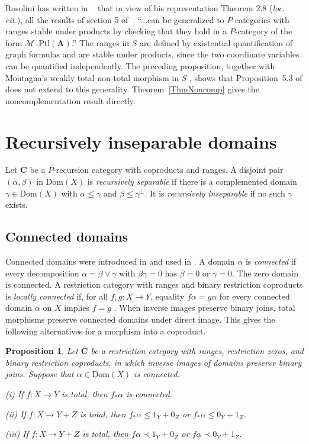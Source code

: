 \documentclass[letterpaper,10pt]{amsart}
\theoremstyle{plain}
\newtheorem{prop}[thm]{Proposition}
\theoremstyle{definition}
\newcommand{\MAP}[3]{{#1}:{#2}\rightarrow{#3}}
\begin{document}
Rosolini has written in  ~\cite[page 313]{MR90e:18001} that in view of his representation Theorem 2.8 ({\it loc. cit.}), all the results of section 5 of ~\cite{MR88i:03078} ``...can be generalized to $P$-categories with ranges stable under products by checking that they hold in a $P$-category of the form
$\mathcal{M}$--$\mathrm{Ptl}(\mathbf{A})$.'' The ranges in $S$ are defined
by existential quantification of graph formulas \cite[p.~111]{MR90i:03046}
and are stable under products, since the two coordinate variables can
be quantified independently. The preceding proposition,
together with Montagna's weakly total non-total morphism in $S$
\cite[Example~1, p.~112]{MR90i:03046}, shows that Proposition~5.3 of
\cite{MR88i:03078} does not extend to this generality. Theorem~\ref{ThmNoncomp} gives the noncomplementation result directly.

\section{Recursively inseparable domains}\label{sec:inseparability}

Let $\mathbf C$ be a $P$-recursion category with coproducts and ranges.
A disjoint pair $(\alpha,\beta)$ in $\mathrm{Dom}(X)$ is
\textit{recursively separable} if there is a complemented domain
$\gamma\in\mathrm{Dom}(X)$ with $\alpha\le\gamma$ and
$\beta\le\gamma^\perp$. It is \textit{recursively inseparable}
if no such $\gamma$ exists.

\subsection{Connected domains}
Connected domains were introduced in \cite{MR92e:03067} and used
in \cite{MR93b:03103,leng}.
A domain $\alpha$ is \textit{connected} if every decomposition
$\alpha=\beta\vee\gamma$ with $\beta\gamma=0$ has $\beta=0$ or
$\gamma=0$. The zero domain is connected. A restriction category with
ranges and binary restriction coproducts is \textit{locally connected}
if, for all $f,g:X\to Y$, equality $f\alpha=g\alpha$ for every
connected domain $\alpha$ on $X$ implies $f=g$ \cite{MR92e:03067}.
When inverse images preserve binary joins, total morphisms preserve
connected domains under direct image. This gives the following
alternatives for a morphism into a coproduct.

\begin{prop}\label{PropAlternative}
Let $\mathbf C$ be a restriction category with ranges, restriction zeros,
and binary restriction coproducts, in which inverse images of domains
preserve binary joins. Suppose that $\alpha\in\mathrm{Dom}(X)$ is
connected.

\noindent(i) If $\MAP{f}{X}{Y}$ is total, then $f_*\alpha$ is connected.

\noindent(ii) If $\MAP{f}{X}{Y + Z}$ is total,
then $f_*\alpha\le 1_Y+0_Z$ or $f_*\alpha\le 0_Y+ 1_Z$.

\noindent(iii) If $\MAP{f}{X}{Y+ Z}$ is total,
then $f\alpha\prec 1_Y+0_Z$ or $f\alpha\prec 0_Y+1_Z$.
\end{prop}
\end{document}

